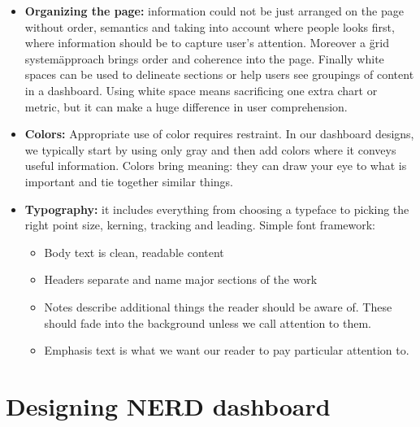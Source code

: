 \documentclass[a4paper,13pt]{report}
\begin{document}
\begin{itemize}
\item \textbf{Organizing the page: } information could not be just arranged on the page without order, semantics and taking into account where people looks first, where information should be to capture user's attention.
Moreover a \"grid system\" approach brings order and coherence into the page. Finally white spaces can be used to delineate sections or help users see groupings of content in a dashboard. Using white space means sacrificing one extra chart or metric, but it can make a huge difference in user comprehension.

\item \textbf{Colors:}
Appropriate use of color requires restraint. In our dashboard designs, we typically start by using only gray and then add colors where it conveys useful information.
Colors bring meaning: they can draw your eye to what is important and tie together similar things.

\item \textbf{Typography: }it includes everything from choosing a typeface to picking the right point size, kerning, tracking and leading.
Simple font framework:
\begin{itemize}                                    
\item Body text is clean, readable content
\item Headers separate and name major sections of the work                                                       
\item Notes describe additional things the reader should be aware of. These should fade into the background unless we call attention to them.
\item Emphasis text is what we want our reader to pay particular attention to.   
\end{itemize}
\end{itemize}

\chapter{Designing NERD dashboard}
\end{document}
